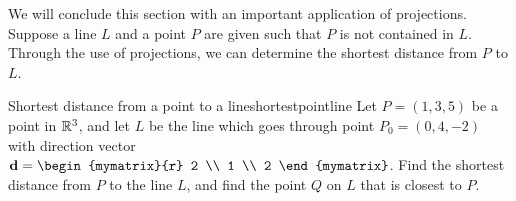 We will conclude this section with an important application of projections. Suppose a line $L$ and a point $P$ are given such that $P$ is not contained in $L$. Through the use of projections, we can determine the shortest distance from $P$ to $L$. 

\begin{example}{Shortest distance from a point to a line}{shortestpointline}
Let $P = (1,3,5)$ be a point in $\mathbb{R}^3$, and let $L$ be the line which goes through point $P_0 = (0,4,-2)$ with direction vector $\vect{d} = \begin{mymatrix}{r}
2 \\
1 \\
2
\end{mymatrix}
$.  Find the shortest distance from $P$ to the line $L$, and find the point $Q$ on $L$ that is closest to $P$. 
\end{example}

